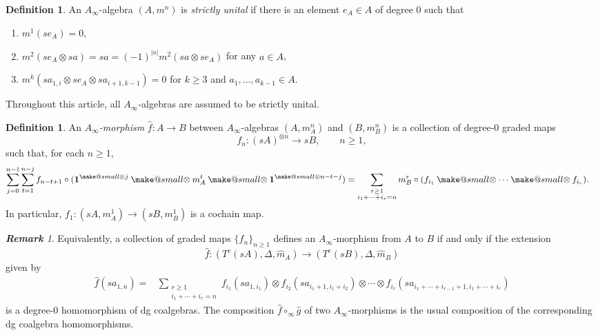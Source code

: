 \documentclass[a4paper, 11pt]{amsart}
\makeatletter
\theoremstyle{definition}
\newtheorem{defn}[thm]{Definition}
\theoremstyle{remark}
\newtheorem{rem}[thm]{\bf Remark}
\numberwithin{equation}{section}
\newcommand{\smallotimes}{\mathbin{\mathpalette\make@small\otimes}}
\newcommand{\make@small}[2]{%
  \vcenter{\hbox{%
    $\m@th\ifx#1\displaystyle\scriptstyle\else\ifx#1\textstyle\scriptstyle
     \else\scriptscriptstyle\fi\fi#2$%
  }}%
}
\makeatother
\begin{document}
\begin{defn}
An $A_\infty$-algebra $(A,m^n)$ is {\it strictly unital} if there is an element $e_A\in A$ of degree $0$ such that
\begin{enumerate}
\item $m^1(se_A) = 0,$
\item $m^2(se_A \otimes sa)=sa=(-1)^{|a|}m^2(sa\otimes se_A)$ for any $a\in A$,
\item $m^k(sa_{1,i} \otimes se_A \otimes sa_{i+1, k-1}) = 0$ for $k \geq 3$ and $a_1,\dotsc, a_{k-1} \in A$.
\end{enumerate}

\end{defn}
Throughout this article, all $A_\infty$-algebras are assumed to be strictly unital.


\begin{defn}\label{defn:ainfinitymorphism}
An {\it $A_{\infty}$-morphism} $\widehat f\colon A\to B$ between $A_\infty$-algebras $(A,m_A^n)$ and $(B,m_B^n)$ is a collection of degree-$0$ graded maps
\[
f_n\colon (sA)^{\otimes n}\to sB,
\qquad n\geq 1,
\]
such that, for each $n\geq 1$,
\begin{equation}\label{equationforAmorph2}
\begin{split}
\sum_{j=0}^{n-1}\sum_{t=1}^{n-j} {} & f_{n-t+1}\circ (\mathbf{1}^{\smallotimes
j}\smallotimes m_A^t\smallotimes \mathbf{1}^{\smallotimes n-t-j})=\sum_{\substack{r\geq 1\\ i_1+\dotsb + i_r=n}} m_{B}^{r} \circ (f_{i_1}\smallotimes \cdots\smallotimes f_{i_r}).
\end{split}
\end{equation}
In particular, $f_1\colon (sA,m_A^1)\to (sB,m_B^1)$ is a cochain map.
\end{defn}

\begin{rem}\label{rem:a-infinitytwo1}
Equivalently, a collection of graded maps $\{f_n\}_{n\geq 1}$ defines an $A_\infty$-morphism from $A$ to $B$ if and only if the extension
\[
\widehat f\colon (T^c(sA),\Delta,\widehat m_A)\to (T^c(sB),\Delta,\widehat m_B)
\]
given by
 \begin{equation*}
 \begin{split}
 \widehat{f} (sa_{1,n}) = & \sum_{\substack{r\geq 1\\ i_1+\dotsb + i_r=n}} f_{i_1}(sa_{1, i_1}) \otimes f_{i_2}(sa_{i_1+1, i_1+i_2}) \otimes \dotsb \otimes f_{i_r}(sa_{i_1+\dotsb+i_{r-1}+1,i_1+\cdots+i_r})
 \end{split}
 \end{equation*}
is a degree-$0$ homomorphism of dg coalgebras.
The composition $\widehat f\circ_\infty \widehat g$ of two $A_\infty$-morphisms is the usual composition of the corresponding dg coalgebra homomorphisms.
\end{rem}
\end{document}
